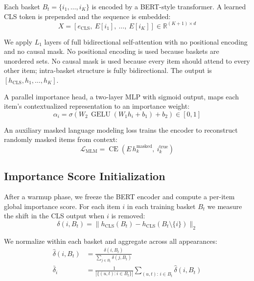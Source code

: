 \documentclass[conference]{IEEEtran}
\begin{document}
Each basket $B_t = \{i_1, \ldots, i_K\}$ is encoded by a BERT-style
transformer. A learned CLS token is prepended and the sequence is
embedded:
\begin{equation}
X = [e_{\text{CLS}},\ E[i_1],\ \ldots,\ E[i_K]] \in \mathbb{R}^{(K+1) \times d}
\end{equation}

We apply $L_1$ layers of full bidirectional self-attention with no
positional encoding and no causal mask.
No positional encoding is used because baskets are unordered sets.
No causal mask is used because every item should attend to every other
item; intra-basket structure is fully bidirectional. The output is
$[h_{\text{CLS}}, h_1, \ldots, h_K]$.

A parallel importance head, a two-layer MLP with sigmoid output,
maps each item's contextualized representation to an importance weight:
\begin{equation}
\alpha_i = \sigma\!\left(W_2\, \operatorname{GELU}(W_1 h_i + b_1) + b_2\right) \in [0,1]
\end{equation}

An auxiliary masked language modeling loss trains the encoder to
reconstruct randomly masked items from context:
\begin{equation}
\mathcal{L}_{\text{MLM}} = \operatorname{CE}\!\left(E\, h_k^{\text{masked}},\ i_k^{\text{true}}\right)
\end{equation}

\subsection{Importance Score Initialization}

After a warmup phase, we freeze the BERT encoder and compute a
per-item global importance score. For each item $i$ in each training
basket $B_t$ we measure the shift in the CLS output when $i$ is
removed:
\begin{equation}
\delta(i, B_t) = \|h_{\text{CLS}}(B_t) - h_{\text{CLS}}(B_t \setminus \{i\})\|_2
\end{equation}

We normalize within each basket and aggregate across all appearances:
\begin{align}
\hat{\delta}(i, B_t) &= \frac{\delta(i, B_t)}{\sum_{j \in B_t} \delta(j, B_t)} \\
\bar{\delta}_i        &= \frac{1}{|\{(u,t):i \in B_t\}|} \sum_{(u,t):\,i \in B_t} \hat{\delta}(i, B_t)
\end{align}
\end{document}
